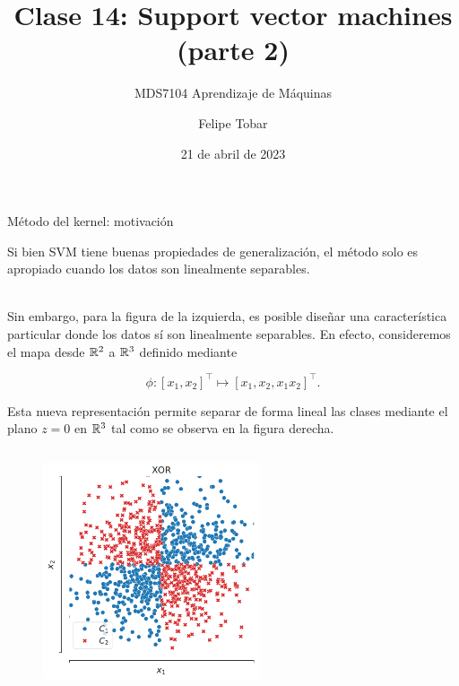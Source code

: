 \documentclass[9pt, handout]{beamer}
\title{Clase 14: Support vector machines (parte 2)}
\subtitle{MDS7104 Aprendizaje de Máquinas}
\date{21 de abril de 2023}
\author{Felipe Tobar}
\institute{Iniciativa de Datos e Inteligencia Artificial\\Universidad de Chile}
\begin{document}
\begin{frame}
  \titlepage
\end{frame}

\begin{frame}{Método del kernel: motivación}

Si bien SVM tiene buenas propiedades de generalización, el método solo es apropiado cuando los datos son linealmente separables. \\~\ \pause

Sin embargo, para la figura de la izquierda, es posible diseñar una característica particular donde los datos sí son linealmente separables. En efecto, consideremos el mapa desde  $\mathbb{R}^2$ a $\mathbb{R}^3$ definido mediante

\begin{equation*}
	\phi: [x_1, x_2]^\top \mapsto [x_1, x_2, x_1 x_2]^\top.
\end{equation*}

Esta nueva representación permite separar de forma lineal las clases mediante el plano $z=0$ en $\mathbb{R}^3$ tal como se observa en la figura derecha.

\begin{columns}
\begin{column}{0.5\textwidth}
\begin{figure}[ht]
    \centering
    \includegraphics[width=0.6\textwidth]{../../img/cap5_xor}
\end{figure}	
\end{column}

\begin{column}{0.5\textwidth}
	

\end{column}
\end{columns}
\end{frame}
\end{document}
